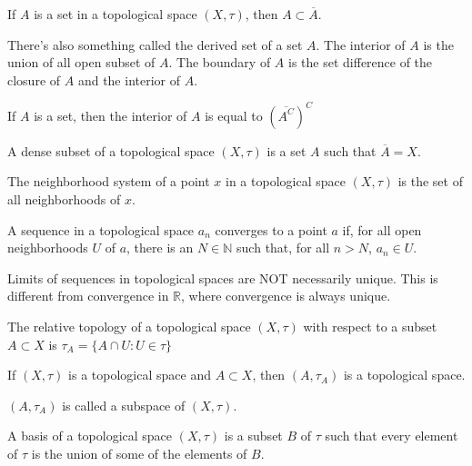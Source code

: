 \documentclass[crop=false,class=article,oneside]{standalone}
\begin{document}
        \begin{theorem}
            If $A$ is a set in a topological space
            $(X,\tau)$, then $A\subset\overline{A}$.
        \end{theorem}
        There's also something called the derived
        set of a set $A$. The interior of $A$
        is the union of all open subset of $A$.
        The boundary of $A$ is the set difference
        of the closure of $A$ and the interior of
        $A$.
        \begin{theorem}
            If $A$ is a set, then
            the interior of $A$ is equal to
            $(\overline{A^{C}})^{C}$
        \end{theorem}
        \begin{definition}
            A dense subset of a topological
            space $(X,\tau)$ is a set $A$
            such that $\overline{A}=X$.
        \end{definition}
        \begin{definition}
            The neighborhood system of a point
            $x$ in a topological space $(X,\tau)$
            is the set of all neighborhoods of
            $x$.
        \end{definition}
        \begin{definition}
            A sequence in a topological space
            $a_{n}$ converges to a point $a$ if,
            for all open neighborhoods $U$ of $a$,
            there is an $N\in\mathbb{N}$ such that,
            for all $n>N$, $a_{n}\in{U}$.
        \end{definition}
        Limits of sequences in topological spaces are NOT
        necessarily unique. This is different from convergence
        in $\mathbb{R}$, where convergence is always unique.
        \begin{definition}
            The relative topology of a
            topological space $(X,\tau)$ with
            respect to a subset $A\subset{X}$
            is $\tau_{A}=\{A\cap{U}:U\in\tau\}$
        \end{definition}
        \begin{theorem}
            If $(X,\tau)$ is a topological space and
            $A\subset{X}$, then
            $(A,\tau_{A})$ is a topological space.
        \end{theorem}
        $(A,\tau_{A})$ is called a subspace of
        $(X,\tau)$.
        \begin{definition}
            A basis of a topological space
            $(X,\tau)$ is a subset $B$ of
            $\tau$ such that every element
            of $\tau$ is the union of some of the
            elements of $B$.
        \end{definition}
\end{document}
